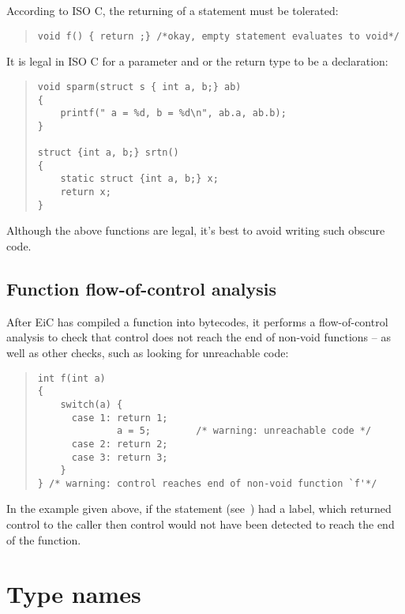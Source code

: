 According to ISO C, the returning of a  statement must
be tolerated:

\begin{quote}
\begin{verbatim}
void f() { return ;} /*okay, empty statement evaluates to void*/
\end{verbatim}
\end{quote}

It is legal in ISO C for a parameter and or the return type to be a
declaration:

\begin{quote}
\begin{verbatim}
void sparm(struct s { int a, b;} ab)
{
    printf(" a = %d, b = %d\n", ab.a, ab.b);
}

struct {int a, b;} srtn()
{
    static struct {int a, b;} x;
    return x;
}
\end{verbatim}
\end{quote}


Although the above functions are legal, it's best to avoid 
writing such obscure code.

\subsection{Function flow-of-control analysis}
\label{sec:FlowOfAnalysis}

After EiC has compiled a function into bytecodes, it
performs a flow-of-control analysis to check that control does not
reach the end of non-void functions -- as well as other checks, such
as looking for unreachable code:

\begin{quote}
\begin{verbatim}
int f(int a)
{
    switch(a) {
      case 1: return 1;
              a = 5;        /* warning: unreachable code */
      case 2: return 2;
      case 3: return 3;
    }
} /* warning: control reaches end of non-void function `f'*/
\end{verbatim}
\end{quote}

In the example given above, if the  statement
(see~) had a  label, which
returned control to the caller then control would not have been
detected to reach the end of the function.

\section{Type names}
\label{sec:TypeNames}

